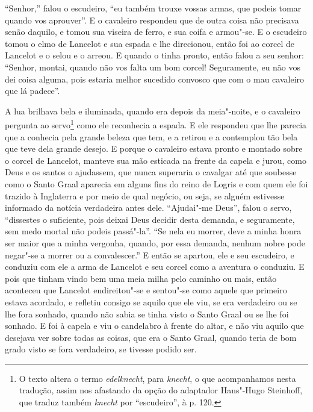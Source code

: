 “Senhor,” falou o escudeiro, “eu também trouxe vossas armas, que podeis tomar
quando vos aprouver”. E o cavaleiro respondeu que de outra coisa não precisava
senão daquilo, e tomou sua viseira de ferro, e sua coifa e armou"-se. E o
escudeiro tomou o elmo de Lancelot e sua espada e lhe direcionou, então foi ao
corcel de Lancelot e o selou e o arreou. E quando o tinha pronto, então falou
a seu senhor: “Senhor, montai, quando não vos falta um bom corcel! Seguramente,
eu não vos dei coisa alguma, pois estaria melhor sucedido convosco que com o
mau cavaleiro que lá padece”. 

A lua brilhava bela e iluminada, quando era depois da meia"-noite, e o cavaleiro
pergunta ao servo\footnote{ O texto altera o termo \textit{edelknecht},
para \textit{knecht},  o que acompanhamos nesta tradução,
assim nos afastando da opção do adaptador Hans"-Hugo Steinhoff, que traduz
também \textit{knecht} por “escudeiro”,  à p. 120.}  como ele reconhecia a espada. E ele
respondeu que lhe parecia que a conhecia pela grande beleza que tem, e a
retirou e a contemplou tão bela que teve dela grande desejo. E porque o
cavaleiro estava pronto e montado sobre o corcel de Lancelot, manteve sua mão
esticada na frente da capela e jurou, como Deus e os santos o ajudassem, que
nunca superaria o cavalgar até que soubesse como o Santo Graal aparecia em
alguns fins do reino de Logris e com quem ele foi trazido à Inglaterra e por
meio de qual negócio, ou seja, se alguém estivesse informado da notícia
verdadeira antes dele. “Ajudai"-me Deus”, falou o servo, “dissestes o
suficiente, pois deixai Deus decidir desta demanda, e seguramente, sem medo
mortal não podeis passá"-la”. “Se nela eu morrer, deve a minha honra ser maior
que a minha vergonha, quando, por essa demanda, nenhum nobre pode negar"-se a
morrer ou a convalescer.” E então se apartou, ele e seu escudeiro, e
conduziu com ele a arma de Lancelot e seu corcel como a aventura o conduziu. E
pois que tinham vindo bem uma meia milha pelo caminho ou mais, então aconteceu
que Lancelot endireitou"-se e sentou"-se como aquele que primeiro estava
acordado, e refletiu consigo se aquilo que ele viu, se era verdadeiro ou se lhe
fora sonhado, quando não sabia se tinha visto o Santo Graal  ou se lhe foi
sonhado. E foi à capela e viu o candelabro à frente do altar, e não viu aquilo
que desejava ver sobre todas as coisas, que era o Santo Graal, quando teria de
bom grado visto se fora verdadeiro, se tivesse podido ser.


